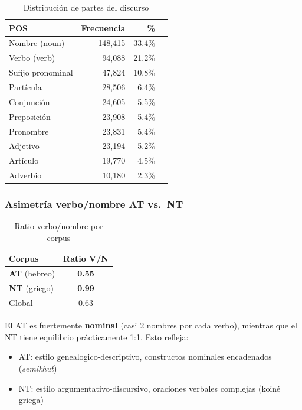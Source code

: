 \documentclass[12pt,a4paper]{article}
\newcommand{\ot}{\textcolor{otcolor}{\textbf{AT}}}
\newcommand{\nt}{\textcolor{ntcolor}{\textbf{NT}}}
\newcommand{\val}[1]{\textcolor{hlcolor}{\textbf{#1}}}
\begin{document}
\begin{table}[H]
\centering
\caption{Distribuci\'on de partes del discurso}
\label{tab:pos}
\begin{tabular}{lrrr}
\toprule
\textbf{POS} & \textbf{Frecuencia} & \textbf{\%} \\
\midrule
Nombre (noun)         & 148,415 & 33.4\% \\
Verbo (verb)          &  94,088 & 21.2\% \\
Sufijo pronominal     &  47,824 & 10.8\% \\
Part\'icula           &  28,506 &  6.4\% \\
Conjunci\'on          &  24,605 &  5.5\% \\
Preposici\'on         &  23,908 &  5.4\% \\
Pronombre             &  23,831 &  5.4\% \\
Adjetivo              &  23,194 &  5.2\% \\
Art\'iculo            &  19,770 &  4.5\% \\
Adverbio              &  10,180 &  2.3\% \\
\bottomrule
\end{tabular}
\end{table}

\subsubsection{Asimetr\'ia verbo/nombre AT vs.\ NT}

\begin{table}[H]
\centering
\caption{Ratio verbo/nombre por corpus}
\label{tab:vnratio}
\begin{tabular}{lc}
\toprule
\textbf{Corpus} & \textbf{Ratio V/N} \\
\midrule
\ot{} (hebreo) & \val{0.55} \\
\nt{} (griego) & \val{0.99} \\
Global          & 0.63 \\
\bottomrule
\end{tabular}
\end{table}

El AT es fuertemente \textbf{nominal} (casi 2 nombres por cada verbo), mientras que
el NT tiene equilibrio pr\'acticamente 1:1. Esto refleja:
\begin{itemize}[leftmargin=2em]
\item AT: estilo genealogico-descriptivo, constructos nominales encadenados (\emph{semikhut})
\item NT: estilo argumentativo-discursivo, oraciones verbales complejas (koin\'e griega)
\end{itemize}
\end{document}
